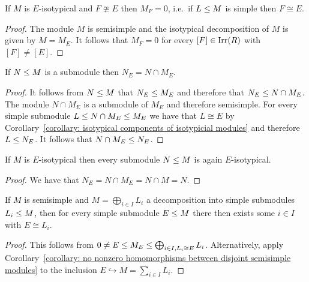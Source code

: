 \begin{corollary}
  \label{corollary: isotypical components of isotypicial modules}
  If $M$ is $E$-isotypical and $F \ncong E$ then $M_F = 0$, i.e.\ if $L \leq M$ is simple then $F \cong E$.
\end{corollary}


\begin{proof}
  The module $M$ is semisimple and the isotypical decomposition of $M$ is given by $M = M_E$.
  It follows that $M_F = 0$ for every $[F] \in \operatorname{Irr}(R)$ with $[F] \neq [E]$.
\end{proof}


\begin{lemma}
  If $N \leq M$ is a submodule then $N_E = N \cap M_E$.
\end{lemma}


\begin{proof}
  It follows from $N \leq M$ that $N_E \leq M_E$ and therefore that $N_E \leq N \cap M_E$.
  The module $N \cap M_E$ is a submodule of $M_E$ and therefore semisimple.
  For every simple submodule $L \leq N \cap M_E \leq M_E$ we have that $L \cong E$ by Corollary~\ref{corollary: isotypical components of isotypicial modules} and therefore $L \leq N_E$.
  It follows that $N \cap M_E \leq N_E$.
\end{proof}


\begin{corollary}
  If $M$ is $E$-isotypical then every submodule $N \leq M$ is again $E$-isotypical.
\end{corollary}


\begin{proof}
  We have that $N_E = N \cap M_E = N \cap M = N$.
\end{proof}


\begin{lemma}
  If $M$ is semisimple and $M = \bigoplus_{i \in I} L_i$ a decomposition into simple submodules $L_i \leq M$, then for every simple submodule $E \leq M$ there then exists some $i \in I$ with $E \cong L_i$.
\end{lemma}


\begin{proof}
  This follows from $0 \neq E \leq M_E \leq \bigoplus_{i \in I, L_i \cong E} L_i$.
  Alternatively, apply Corollary~\ref{corollary: no nonzero homomorphisms between disjoint semisimple modules} to the inclusion $E \hookrightarrow M = \sum_{i \in I} L_i$.
\end{proof}


